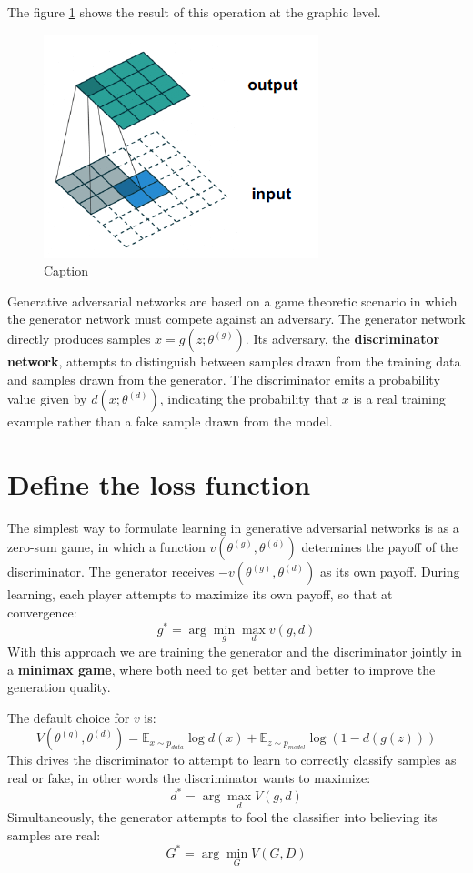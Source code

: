 The figure \ref{fig:TConvRes} shows the result of this operation at the graphic level.

\begin{figure}[!ht]
    \centering
    \includegraphics[width=0.5\linewidth]{img/GAN/results.png}
    \caption{Caption}
    \label{fig:TConvRes}
\end{figure}

Generative adversarial networks are based on a game theoretic scenario in which the generator network must 
compete against an adversary. The generator network directly produces samples $x = g(z; \theta^{(g)})$. 
Its adversary, the \textbf{discriminator network}, attempts to distinguish between samples drawn from the 
training data and samples drawn from the generator. The discriminator emits a probability value given by 
$d(x; \theta^{(d)})$, indicating the probability that $x$ is a real training example rather than a fake 
sample drawn from the model.
\section{Define the loss function}
The simplest way to formulate learning in generative adversarial networks is as a zero-sum game, in which 
a function $v(\theta^{(g)}, \theta^{(d)})$ determines the payoff of the discriminator. The generator 
receives $- v(\theta^{(g)}, \theta^{(d)})$ as its own payoff. During learning, each player attempts to 
maximize its own payoff, so that at convergence:
\begin{equation}
    g^\ast = \arg \min_{g} \max_{d} v(g, d)
\end{equation}
With this approach we are training the generator and the discriminator jointly in a \textbf{minimax game}, where 
both need to get better and better to improve the generation quality.

The default choice for $v$ is:
\begin{equation}
    V(\theta^{(g)}, \theta^{(d)}) = \mathbb{E}_{x \sim p_{data}} \log d(x) + \mathbb{E}_{z \sim p_{model}} \log(1 - d(g(z)))
\end{equation}
This drives the discriminator to attempt to learn to correctly classify samples as real or fake, in 
other words the discriminator wants to maximize:
\begin{equation*}
    d^\ast = \arg \max_d V(g,d)
\end{equation*}
Simultaneously, the generator attempts to fool the classifier into believing its samples are real:
\begin{equation*}
    G^\ast = \arg \min_G V(G,D)
\end{equation*}

